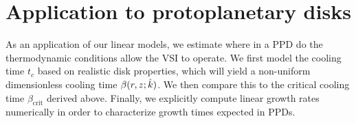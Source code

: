 \section{Application to protoplanetary disks}\label{application} 


As an application of our linear models, we estimate where in a
PPD do the thermodynamic conditions allow the VSI to
operate. We first model the cooling time $t_c$ based on realistic
disk properties, which will yield a non-uniform dimensionless cooling
time $\beta(r,z;\hat{k})$. We then compare this to the critical cooling time
$\beta_\mathrm{crit}$ derived above. Finally, we explicitly compute 
linear growth rates numerically in order to characterize 
growth times expected in PPDs.  


